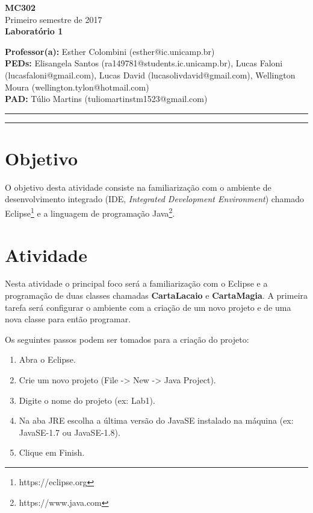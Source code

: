 \documentclass[10pt]{article}
\begin{document}

\begin{large}
	\begin{center}
		\textbf{MC302} \\
		Primeiro semestre de 2017 \\ \vspace{0.5cm}
		\textbf{Laboratório 1}
	\end{center}
\end{large}
\vspace{0.25cm}
\noindent \textbf{Professor(a):} Esther Colombini (esther@ic.unicamp.br) \\
\textbf{PEDs:} Elisangela Santos (ra149781@students.ic.unicamp.br), Lucas Faloni (lucasfaloni@gmail.com), Lucas David (lucasolivdavid@gmail.com), Wellington Moura (wellington.tylon@hotmail.com) \\
\textbf{PAD:} Túlio Martins (tuliomartinstm1523@gmail.com) \\

\hrule \hrule

\section{Objetivo}

O objetivo desta atividade consiste na familiarização com o ambiente de desenvolvimento integrado (IDE, \textit{Integrated Development Environment}) chamado Eclipse\footnote{https://eclipse.org} e a linguagem de programação Java\footnote{https://www.java.com}.

\section{Atividade}

Nesta atividade o principal foco será a familiarização com o Eclipse e a programação de duas classes chamadas \textbf{CartaLacaio} e \textbf{CartaMagia}. A primeira tarefa será configurar o ambiente com a criação de um novo projeto e de uma nova classe para então programar.

Os seguintes passos podem ser tomados para a criação do projeto:
\begin{enumerate}
    \item Abra o Eclipse.
    \item Crie um novo projeto (File -> New -> Java Project).
    \item Digite o nome do projeto (ex: Lab1).
    \item Na aba JRE escolha a última versão do JavaSE instalado na máquina (ex: JavaSE-1.7 ou JavaSE-1.8).
    \item Clique em Finish.
\end{enumerate}
\end{document}
